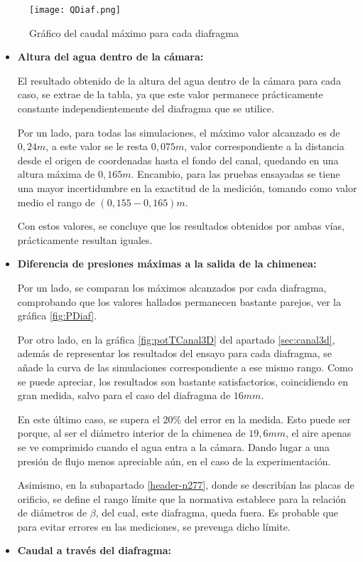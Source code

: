 \begin{figure}
  \centering
  \texttt{[image: QDiaf.png]}
  \caption[Gráfica comparación de caudal máximo]{Gráfico del caudal máximo para cada diafragma}
  \label{fig:QDiaf}
  \end{figure}

\begin{itemize}
\item
  \textbf{Altura del agua dentro de la cámara:}

  El resultado obtenido de la altura del agua dentro de la cámara para
  cada caso, se extrae de la tabla, ya que este valor permanece
  prácticamente constante independientemente del diafragma que se
  utilice.

  Por un lado, para todas las simulaciones, el máximo valor alcanzado es
  de \(0,24m\), a este valor se le resta \(0,075m\), valor
  correspondiente a la distancia desde el origen de coordenadas hasta el
  fondo del canal, quedando en una altura máxima de \(0,165m\).
  Encambio, para las pruebas ensayadas se tiene una mayor incertidumbre
  en la exactitud de la medición, tomando como valor medio el rango de
  \((0,155-0,165)m\).

  Con estos valores, se concluye que los resultados obtenidos por ambas
  vías, prácticamente resultan iguales.
\item
  \textbf{Diferencia de presiones máximas a la salida de la chimenea:}

  Por un lado, se comparan los máximos alcanzados por cada diafragma,
  comprobando que los valores hallados permanecen bastante parejos, ver la gráfica \autoref{fig:PDiaf}.

  Por otro lado, en la gráfica \autoref{fig:potTCanal3D} del apartado \ref{sec:canal3d}, además de representar los
  resultados del ensayo para cada diafragma, se añade la curva de las
  simulaciones correspondiente a ese mismo rango. Como se puede
  apreciar, los resultados son bastante satisfactorios, coincidiendo en
  gran medida, salvo para el caso del diafragma de \(16mm\).

  En este último caso, se supera el 20\% del error en la medida. Esto
  puede ser porque, al ser el diámetro interior de la chimenea de
  \(19,6mm\), el aire apenas se ve comprimido cuando el agua entra a la
  cámara. Dando lugar a una presión de flujo menos apreciable aún, en el
  caso de la experimentación.

  Asimismo, en la subapartado \ref{header-n277}, donde se describían las placas de orificio, se
  define el rango límite que la normativa establece para la relación de
  diámetros de \(\beta\), del cual, este diafragma, queda fuera. Es
  probable que para evitar errores en las mediciones, se prevenga
   dicho límite.
\item
  \textbf{Caudal a través del diafragma:}


\end{itemize}
